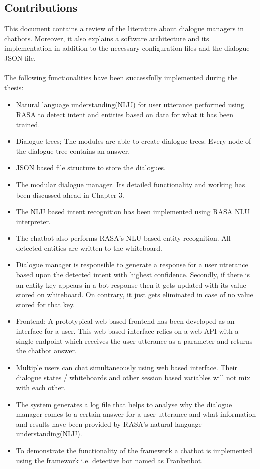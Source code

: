 \subsection{Contributions}
This document contains a review of the literature about dialogue managers in chatbots. Moreover, it also explains a software architecture and its implementation in addition to the necessary configuration files and the dialogue JSON file.
\\~\\
The following functionalities have been successfully implemented during the thesis:
\begin{itemize}
  \item Natural language understanding(NLU) for user utterance performed using RASA to detect intent and entities based on data for what it has been trained.
   \item Dialogue trees; The modules are able to create dialogue trees. Every node of the dialogue tree contains an answer.
   \item JSON based file structure to store the dialogues.
   \item The modular dialogue manager. Its detailed functionality and working has been discussed ahead in Chapter 3.
   \item The NLU based intent recognition has been implemented using RASA NLU interpreter.
   \item The chatbot also performs RASA's NLU based entity recognition. All detected entities are written to the whiteboard.
   \item Dialogue manager is responsible to generate a response for a user utterance based upon the detected intent with highest confidence. Secondly, if there is an entity key appears in a bot response then it gets updated with its value stored on whiteboard. On contrary, it just gets eliminated in case of no value stored for that key.
   \item Frontend: A prototypical web based frontend has been developed as an interface for a user. This web based interface relies on a  web API with a single endpoint which receives the user utterance as a parameter and returns the chatbot answer.
   \item Multiple users can chat simultaneously using web based interface. Their dialogue states / whiteboards and other session based variables will not mix with each other.
   \item The system generates a log file that helps to analyse why the dialogue manager comes to a certain answer for a user utterance and what information and results have been provided by RASA's natural language understanding(NLU).
   \item To demonstrate the functionality of the framework a chatbot is implemented using the framework i.e. detective bot named as Frankenbot.
\end{itemize}

